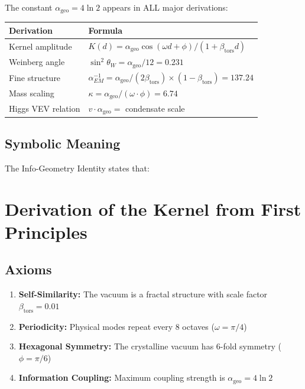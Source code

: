 \documentclass[11pt, a4paper]{article}
\theoremstyle{remark}
\newcommand{\alphageo}{\alpha_{\text{geo}}}
\newcommand{\betators}{\beta_{\text{tors}}}
\begin{document}
The constant $\alphageo = 4\ln 2$ appears in ALL major derivations:

\begin{center}
\begin{tabular}{|l|l|}
\hline
\textbf{Derivation} & \textbf{Formula} \\
\hline
Kernel amplitude & $K(d) = \alphageo \cos(\omega d + \phi) / (1 + \betators d)$ \\
Weinberg angle & $\sin^2\theta_W = \alphageo / 12 = 0.231$ \\
Fine structure & $\alpha_{EM}^{-1} = \alphageo / (2\betators) \times (1 - \betators) = 137.24$ \\
Mass scaling & $\kappa = \alphageo / (\omega \cdot \phi) = 6.74$ \\
Higgs VEV relation & $v \cdot \alphageo = $ condensate scale \\
\hline
\end{tabular}
\end{center}

\subsection{Symbolic Meaning}

The Info-Geometry Identity states that:
\begin{center}
\end{center}

\section{Derivation of the Kernel from First Principles}

\subsection{Axioms}

\begin{enumerate}
    \item \textbf{Self-Similarity:} The vacuum is a fractal structure with scale factor $\betators = 0.01$
    \item \textbf{Periodicity:} Physical modes repeat every 8 octaves ($\omega = \pi/4$)
    \item \textbf{Hexagonal Symmetry:} The crystalline vacuum has 6-fold symmetry ($\phi = \pi/6$)
    \item \textbf{Information Coupling:} Maximum coupling strength is $\alphageo = 4\ln 2$
\end{enumerate}
\end{document}
